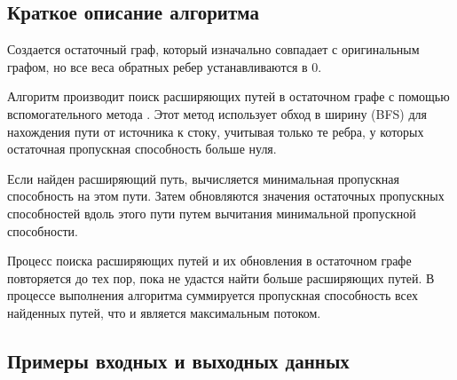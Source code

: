 \subsection{Краткое описание алгоритма}
Создается остаточный граф, который изначально совпадает с оригинальным графом,
но все веса обратных ребер устанавливаются в 0.

Алгоритм производит поиск расширяющих путей в остаточном графе с помощью вспомогательного
метода . Этот метод использует обход в ширину (BFS) для нахождения
пути от источника к стоку, учитывая только те ребра, у которых остаточная пропускная способность больше нуля.

Если найден расширяющий путь, вычисляется минимальная пропускная способность на этом пути. Затем
обновляются значения остаточных пропускных способностей вдоль этого пути путем вычитания минимальной
пропускной способности.

Процесс поиска расширяющих путей и их обновления в остаточном графе повторяется до тех пор, пока не
удастся найти больше расширяющих путей. В процессе выполнения алгоритма суммируется пропускная
способность всех найденных путей, что и является максимальным потоком.

\subsection{Примеры входных и выходных данных}
